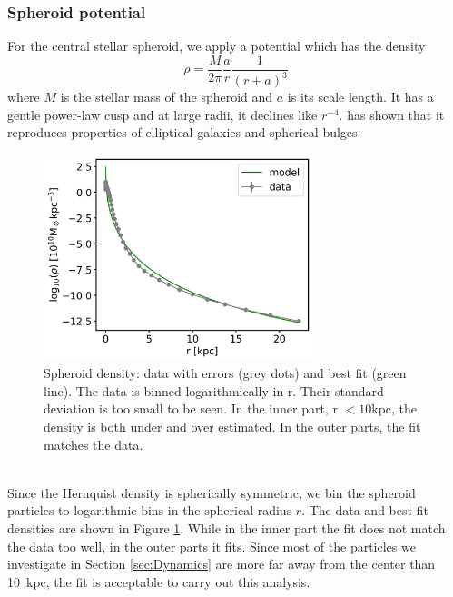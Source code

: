 \subsubsection{Spheroid potential}\label{subsubsec:spher_pot}
For the central stellar spheroid, we apply a \citet{Hernquistprofile} potential which has the density 
\begin{equation}
    \rho = \frac{M}{2\pi}\frac{a}{r}\frac{1}{(r+a)^3}
\end{equation}
where $M$ is the stellar mass of the spheroid and $a$ is its scale length. It has a gentle power-law cusp and at large radii, it declines like $r^{-4}$. \citet{Hernquistprofile} has shown that it reproduces properties of elliptical galaxies and spherical bulges. 
\\
\begin{figure}
\captionsetup{format=plain}
    \centering
    \includegraphics[width=0.7\textwidth]{plots/Auriga/spheroid_density_fit_snap_127.png}
    \caption{Spheroid density: data with errors (grey dots) and best fit (green line). The data is binned logarithmically in r. Their standard deviation is too small to be seen. In the inner part, r $<10$kpc, the density is both under and over estimated. In the outer parts, the fit matches the data.}
    \label{fig:spheroid_fit}
\end{figure}
\\Since the Hernquist density is spherically symmetric, we bin the spheroid particles to logarithmic bins in the spherical radius $r$. The data and best fit densities are shown in Figure \ref{fig:spheroid_fit}. While in the inner part the fit does not match the data too well, in the outer parts it fits. Since most of the particles we investigate in Section \ref{sec:Dynamics} are more far away from the center than \SI{10}{kpc}, the fit is acceptable to carry out this analysis.


